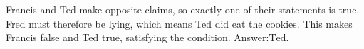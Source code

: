 Francis and Ted make opposite claims, so exactly one of their statements is true. Fred must therefore be lying, which means Ted did eat the cookies. This makes Francis false and Ted true, satisfying the condition. Answer:$\boxed{\text{Ted}}$.

